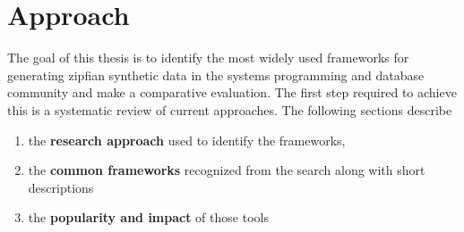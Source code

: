 \chapter{Approach}\label{chapter:approach}

\mytable

\def\printonlypositive#1{\ifnum#1>0
#1
\fi}

\newcommand{\drawPie}[1]{%
  \pgfplotstablegetelem{#1}{Venue}\of\mytable
  \let\venue\pgfplotsretval

  \pgfplotstablegetelem{#1}{YCSB}\of\mytable
  \let\valYCSB\pgfplotsretval

  \pgfplotstablegetelem{#1}{Sysbench}\of\mytable
  \let\valSysbench\pgfplotsretval

  \pgfplotstablegetelem{#1}{FIO}\of\mytable
  \let\valFIO\pgfplotsretval

  \pgfplotstablegetelem{#1}{OLTPBench}\of\mytable
  \let\valOLTP\pgfplotsretval

  \pgfplotstablegetelem{#1}{DBGen}\of\mytable
  \let\valDBGen\pgfplotsretval

  \begin{tikzpicture}[baseline=(current bounding box.north)]
    \node[font=\bfseries] at (0,1.5) {\venue};

    \pie[
      /tikz/nodes={font=\footnotesize},
      color={blue!50!white, red!50!white, green!50!white, orange!50!white, purple!50!white},
      sum=auto,
      radius=1,
      text=legend,
      before number=\printonlypositive,
    ]{
      \valYCSB/YCSB,
      \valSysbench/Sysbench,
      \valFIO/FIO,
      \valOLTP/OLTPBench,
      \valDBGen/DBGen
    }
  \end{tikzpicture}
}


The goal of this thesis is to identify the most widely used frameworks for generating zipfian synthetic data in the systems programming and database community and 
make a comparative evaluation.
The first step required to achieve this is a systematic review of current approaches. The following sections describe
\begin{enumerate}
    \item the \textbf{research approach} used to identify the frameworks,
    \item the \textbf{common frameworks} recognized from the search along with short descriptions
    \item the \textbf{popularity and impact} of those tools
\end{enumerate}

